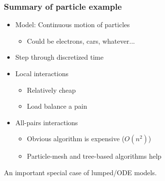 \documentclass{beamer}
\begin{document}
\begin{frame}
  \frametitle{Summary of particle example}

  \begin{itemize}
  \item Model: Continuous motion of particles
    \begin{itemize}
    \item Could be electrons, cars, whatever...
    \end{itemize}
  \item Step through discretized time
  \item Local interactions
    \begin{itemize}
    \item Relatively cheap
    \item Load balance a pain
    \end{itemize}
  \item All-pairs interactions
    \begin{itemize}
    \item Obvious algorithm is expensive ($O(n^2)$)
    \item Particle-mesh and tree-based algorithms help
    \end{itemize}
  \end{itemize}

  An important special case of lumped/ODE models.
\end{frame}
\end{document}
